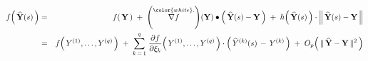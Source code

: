 \begin{eqnarray*}
f\!\left(\,\widehat{\mathbf{Y}}(s)\,\right)
& = &
    f\!\left(\,\mathbf{Y}\,\right)
    \; + \;
    \left(\overset{{\color{white}.}}{\nabla f}\right)\!(\mathbf{Y})
    \bullet
    \left(\,\widehat{\mathbf{Y}}(s) - \mathbf{Y}\,\right)
    \; + \;
    h\!\left(\,\widehat{\mathbf{Y}}(s)\,\right)
    \cdot
    \left\Vert\,
        \widehat{\mathbf{Y}}(s) - \mathbf{Y}
        \,\right\Vert
\\
& = &
    f\!\left(\,Y^{(1)},\ldots,Y^{(q)}\,\right)
    \; + \;
    \overset{q}{\underset{k\,=\,1}{\sum}}\;
    \dfrac{\partial f}{\partial \xi_{k}}\!\left(\,
        Y^{(1)},\ldots,Y^{(q)}
        \,\right)
    \cdot
    \left(\,\widehat{Y}^{(k)}(s)\,-\,Y^{(k)}\,\right)
    \; + \;
    O_{p}\!\left(\,\Vert\,\widehat{\mathbf{Y}} - \mathbf{Y}\,\Vert^{2}\,\right)
\end{eqnarray*}

